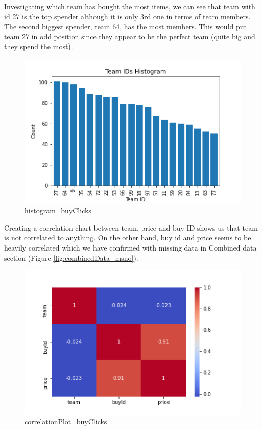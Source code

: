 Investigating which team has bought the most items, we can see that team with id 27 is the top spender although it is only 3rd one in terms of team members. The second biggest spender, team 64, has the most members. This would put team 27 in odd position since they appear to be the perfect team (quite big and they spend the most).
\begin{figure}[H]
\includegraphics[scale=0.85]{img/Graphs/buyClicks/histogram_buyClicks.png}
\centering
\caption{histogram\_buyClicks}
\label{fig:histogram_buyClicks}
\end{figure}

Creating a correlation chart between team, price and buy ID shows us that team is not correlated to anything. On the other hand, buy id and price seems to be heavily correlated which we have confirmed with missing data in Combined data section (Figure \ref{fig:combinedData_msno}).
\begin{figure}[H]
\includegraphics[scale=0.85]{img/Graphs/buyClicks/correlationPlot_buyClicks.png}
\centering
\caption{correlationPlot\_buyClicks}
\label{fig:correlationPlot_buyClicks}
\end{figure}